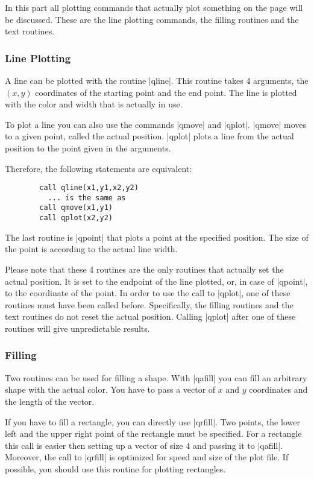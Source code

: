 \documentclass{article}
\begin{document}
In this part all plotting commands that actually plot something on the
page will be discussed. These are the line plotting commands, the
filling routines and the text routines.


\subsubsection{Line Plotting}

A line can be plotted with the routine |qline|. This routine takes 4
arguments, the $(x,y)$ coordinates of the starting point and the end
point. The line is plotted with the color and width that is actually in
use.

To plot a line you can also use the commands |qmove| and |qplot|.
|qmove| moves to a given point, called the actual position. |qplot|
plots a line from the actual position to the point given in the
arguments.

Therefore, the following statements are equivalent:

\begin{verbatim}
        call qline(x1,y1,x2,y2)
          ... is the same as
        call qmove(x1,y1)
        call qplot(x2,y2)
\end{verbatim}

The last routine is |qpoint| that plots a point at the specified
position. The size of the point is according to the actual line width.

Please note that these 4 routines are the only routines that actually
set the actual position. It is set to the endpoint of the line
plotted, or, in case of |qpoint|, to the coordinate of the point.
In order to use the call to |qplot|, one of
these routines must have been called before. Specifically, the filling
routines and the text routines do not reset the actual position.
Calling |qplot| after one of these routines will give unpredictable
results.

\subsubsection{Filling}

Two routines can be used for filling a shape. With |qafill| you can
fill an arbitrary shape with the actual color. You have to pass a
vector of $x$ and $y$ coordinates and the length of the vector.

If you have to fill a rectangle, you can directly use |qrfill|. Two
points, the lower left and the upper right point of the rectangle must
be specified. For a rectangle this call is easier then setting up a
vector of size 4 and passing it to |qafill|. Moreover, the call to
|qrfill| is optimized for speed and size of the plot file. 
If possible, you should use this routine for plotting rectangles.
\end{document}
